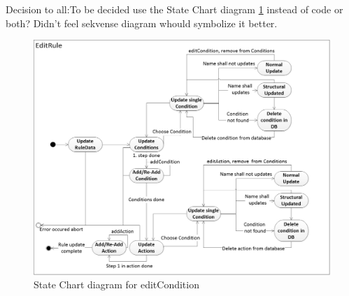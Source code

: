 Decision to all:To be decided use the State Chart diagram \ref{fig:tilstandsdiagram} instead of code or both? Didn't feel sekvense diagram whould symbolize it better.

\begin{figure}
	\centering
		\includegraphics[width=1.50\textwidth, angle=90]{images/tilstandsdiagram.jpg}
	\caption{State Chart diagram for editCondition}
	\label{fig:tilstandsdiagram}
\end{figure}

